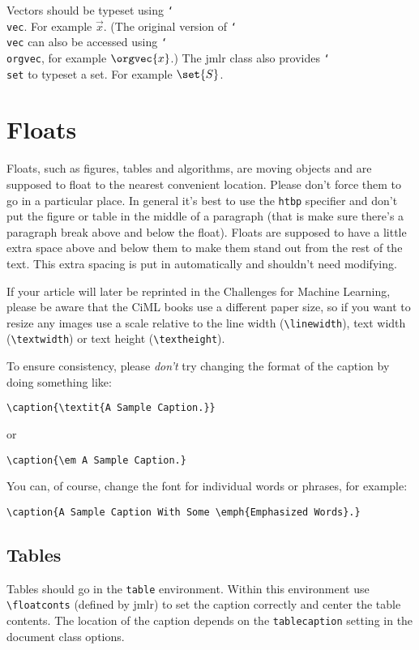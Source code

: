 \documentclass[pmlr,twocolumn,10pt]{jmlr} %
\newcommand{\cs}[1]{\texttt{\char`\\#1}}%
\begin{document}
Vectors should be typeset using \cs{vec}. For example $\vec{x}$.
(The original version of \cs{vec} can also be accessed using
\cs{orgvec}, for example $\orgvec{x}$.)
The \textsf{jmlr} class also provides \cs{set} to typeset a
set. For example $\set{S}$.

\section{Floats}
\label{sec:floats}

Floats, such as figures, tables and algorithms, are moving
objects and are supposed to float to the nearest convenient
location. Please don't force them to go in a particular place. In
general it's best to use the \texttt{htbp} specifier and don't
put the figure or table in the middle of a paragraph (that is
make sure there's a paragraph break above and below the float).
Floats are supposed to have a little extra space above and below
them to make them stand out from the rest of the text. This extra
spacing is put in automatically and shouldn't need modifying.

If your article will later be reprinted in the Challenges for
Machine Learning, please be aware that the CiML books use a
different paper size, so if you want to resize any images use a
scale relative to the line width (\verb|\linewidth|), text width
(\verb|\textwidth|) or text height (\verb|\textheight|).

To ensure consistency, please \emph{don't} try changing the format of the caption by doing
something like:
\begin{verbatim}
\caption{\textit{A Sample Caption.}}
\end{verbatim}
or
\begin{verbatim}
\caption{\em A Sample Caption.}
\end{verbatim}
You can, of course, change the font for individual words or 
phrases, for example:
\begin{verbatim}
\caption{A Sample Caption With Some \emph{Emphasized Words}.}
\end{verbatim}

\subsection{Tables}
\label{sec:tables}

Tables should go in the \texttt{table} environment. Within this
environment use \verb|\floatconts| (defined by \textsf{jmlr})
to set the caption correctly and center the table contents.
The location of the caption depends on the \verb|tablecaption|
setting in the document class options.
\end{document}
